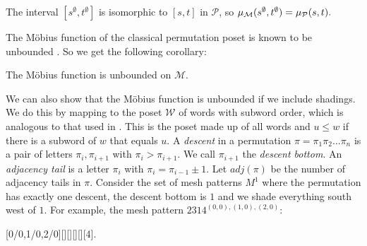 \documentclass[11pt,a4paper,oneside]{article}
\begin{document}
\begin{lem}
The interval $[s^\emptyset,t^\emptyset]$ is isomorphic to
$[s,t]$ in $\mathcal{P}$, so $\operatorname{\mu_\mathcal{M}}(s^\emptyset,t^\emptyset)=\operatorname{\mu_\mathcal{P}}(s,t).$
\end{lem}

The M\"obius function of the classical permutation poset is known to be
unbounded \cite{Smith13}. So we get the following corollary:

\begin{cor}
The M\"obius function is unbounded on $\mathcal{M}$.
\end{cor}

We can also show that the M\"obius function is unbounded if we include shadings.
We do this by mapping to the poset $\mathcal{W}$ of words with subword order, 
which is analogous to that used in \cite[Section 2]{Smith14}.
This is the poset made up of all words and $u\le w$ if there is a subword of $w$
that equals $u$.
A \emph{descent} in a permutation $\pi=\pi_1\pi_2\ldots\pi_n$ is a pair of
letters $\pi_i,\pi_{i+1}$ with $\pi_{i}>\pi_{i+1}$. We call $\pi_{i+1}$ the \emph{descent bottom}.
An \emph{adjacency tail} is a letter $\pi_i$ with $\pi_i=\pi_{i-1}\pm 1$.
Let $adj(\pi)$ be the number of adjacency tails in $\pi$.
Consider the set of mesh patterns $M^1$ where the permutation has exactly one descent,
the descent bottom is $1$ and we shade everything south west of $1$. For example, the mesh pattern $2314^{(0,0),(1,0),(2,0)}$:
\begin{center}
[0/0,1/0,2/0][][][][][4].
\end{center}
\end{document}
